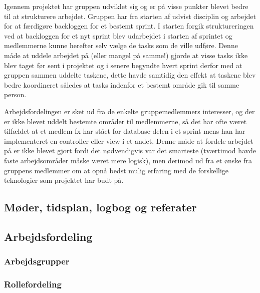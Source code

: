 Igennem projektet har gruppen udviklet sig og er på visse punkter blevet bedre til at strukturere arbejdet. Gruppen har fra starten af udvist disciplin og arbejdet for at færdigøre backloggen for et bestemt sprint. I starten forgik struktureringen ved at backloggen for et nyt sprint blev udarbejdet i starten af sprintet og medlemmerne kunne herefter selv vælge de tasks som de ville udføre. Denne måde at uddele arbejdet på (eller mangel på samme!) gjorde at visse tasks ikke blev taget før sent i projektet og i senere begyndte hvert sprint derfor med at gruppen sammen uddelte taskene, dette havde samtidig den effekt at taskene blev bedre koordineret således at tasks indenfor et bestemt område gik til samme person. 


Arbejdsfordelingen er sket ud fra de enkelte gruppemedlemmers interesser, og der er ikke blevet uddelt bestemte områder til medlemmerne, så det har ofte været tilfældet at et medlem fx har stået for database-delen i et sprint mens han har implementeret en controller eller view i et andet. Denne måde at fordele arbejdet på er ikke blevet gjort fordi det nødvendigvis var det smarteste (tværtimod havde faste arbejdsområder måske været mere logisk), men derimod ud fra et ønske fra gruppens medlemmer om at opnå bedst mulig erfaring med de forskellige teknologier som projektet har budt på.

\subsection{Møder, tidsplan, logbog og referater}

\subsection{Arbejdsfordeling}

\subsubsection{Arbejdsgrupper}

\subsubsection{Rollefordeling}
